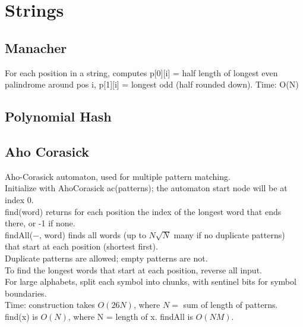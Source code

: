 \documentclass{article}
\begin{document}
\section*{Strings}


\begin{multicols}{2}

\subsection*{Manacher}
  For each position in a string, computes p[0][i] = half length of
longest even palindrome around pos i, p[1][i] = longest odd (half rounded down).
Time: O(N)
  
  \columnbreak


  \subsection*{Polynomial Hash}
  
\end{multicols}

\subsection*{Aho Corasick}
Aho-Corasick automaton, used for multiple pattern matching.
\\Initialize with AhoCorasick ac(patterns); the automaton start node will be at index 0.
\\find(word) returns for each position the index of the longest word that ends there, or -1 if none.
\\findAll($-$, word) finds all words (up to $N \sqrt N$ many if no duplicate patterns)
\\that start at each position (shortest first).
\\Duplicate patterns are allowed; empty patterns are not.
\\To find the longest words that start at each position, reverse all input.
\\For large alphabets, split each symbol into chunks, with sentinel bits for symbol boundaries.
\\Time: construction takes $O(26N)$, where $N =$ sum of length of patterns.
\\find(x) is $O(N)$, where N = length of x. findAll is $O(NM)$.
  
\end{document}
